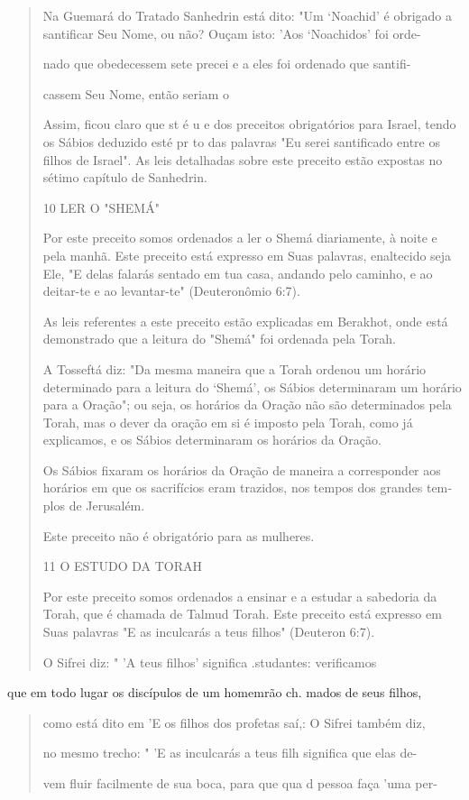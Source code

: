 \begin{quote}
Na Guemará do Tratado Sanhedrin está dito: "Um `Noachid' é obri­gado a
santificar Seu Nome, ou não? Ouçam isto: 'Aos `Noachidos' foi orde-

nado que obedecessem sete precei e a eles foi ordenado que santifi-

cassem Seu Nome, então seriam o

Assim, ficou claro que st é u e dos preceitos obrigatórios para Is­rael,
tendo os Sábios deduzido esté pr to das palavras "Eu serei santificado
entre os filhos de Israel". As leis detalhadas sobre este preceito estão
expostas no sétimo capítulo de Sanhedrin.

10 LER O "SHEMÁ"

Por este preceito somos ordenados a ler o Shemá diariamente, à noi­te e
pela manhã. Este preceito está expresso em Suas palavras, enaltecido
seja Ele, "E delas falarás sentado em tua casa, andando pelo caminho, e
ao deitar-te e ao levantar-te" (Deuteronômio 6:7).

As leis referentes a este preceito estão explicadas em Berakhot, on­de
está demonstrado que a leitura do "Shemá" foi ordenada pela Torah.

A Tosseftá diz: "Da mesma maneira que a Torah ordenou um horá­rio
determinado para a leitura do `Shemá', os Sábios determinaram um horário
para a Oração"; ou seja, os horários da Oração não são determinados pela
To­rah, mas o dever da oração em si é imposto pela Torah, como já
explicamos, e os Sábios determinaram os horários da Oração.

Os Sábios fixaram os horários da Oração de maneira a corresponder aos
horários em que os sacrifícios eram trazidos, nos tempos dos grandes
tem­plos de Jerusalém.

Este preceito não é obrigatório para as mulheres.

11 O ESTUDO DA TORAH

Por este preceito somos ordenados a ensinar e a estudar a sabedoria da
Torah, que é chamada de Talmud Torah. Este preceito está expresso em
Suas palavras "E as inculcarás a teus filhos" (Deuteron 6:7).

O Sifrei diz: " 'A teus filhos' significa .studantes: verificamos
\end{quote}

que em todo lugar os discípulos de um homemrão ch. mados de seus filhos,

\begin{quote}
como está dito em 'E os filhos dos profetas saí,: O Sifrei também diz,

no mesmo trecho: " 'E as inculcarás a teus filh significa que elas de-

vem fluir facilmente de sua boca, para que qua d pessoa faça 'uma per-
\end{quote}

